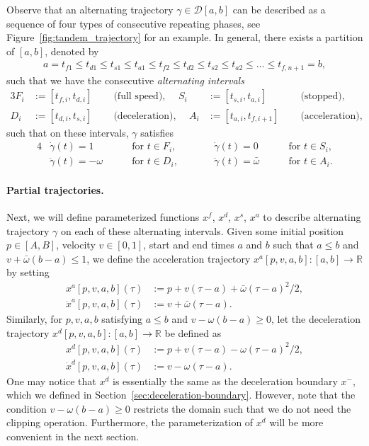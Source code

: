 \documentclass[a4paper]{article}
\theoremstyle{definition}
\theoremstyle{plain}
\begin{document}
Observe that an alternating trajectory $\gamma \in \mathcal{D}[a,b]$ can be described
as a sequence of four types of consecutive repeating phases, see
Figure~\ref{fig:tandem_trajectory} for an example.
%
In general, there exists a partition of $[a,b]$, denoted by
\begin{align*}
  a = t_{f1} \leq t_{d1} \leq t_{s1} \leq t_{a1} \leq t_{f2} \leq t_{d2} \leq t_{s2} \leq t_{a2} \leq \dots \leq t_{f,n+1} = b,
\end{align*}
such that we have the consecutive \emph{alternating intervals}
\begin{alignat*}{3}
  F_{i} &:= [t_{f,i}, t_{d,i}] \quad &\text{ (full speed), } \quad
  S_{i} &:= [t_{s,i}, t_{a,i}] \quad &\text{ (stopped), } \\
  D_{i} &:= [t_{d,i}, t_{s,i}] \quad &\text{ (deceleration), } \quad
  A_{i} &:= [t_{a,i}, t_{f,i+1}] \quad  &\text{ (acceleration), }
\end{alignat*}
%
such that on these intervals, $\gamma$ satisfies
%
\begin{alignat*}{4}
  &\dot{\gamma}(t) = 1 && \text{ for } t \in F_{i} , \quad \quad
  &&\dot{\gamma}(t) = 0 && \text{ for } t \in S_{i} ,\\
  &\ddot{\gamma}(t) = -\omega \quad && \text{ for } t \in D_{i} , \quad \quad
  &&\ddot{\gamma}(t) = \bar{\omega} \quad && \text{ for } t \in A_{i} .
\end{alignat*}

\paragraph{Partial trajectories.}
Next, we will define parameterized functions $x^{f}$, $x^{d}$, $x^{s}$, $x^{a}$
to describe alternating trajectory $\gamma$ on each of these alternating intervals.
%
Given some initial position $p \in [A,B]$, velocity $v \in [0, 1]$, start and end times $a$ and
$b$ such that $a \leq b$ and $v + \bar{\omega}(b - a) \leq 1$, we define the acceleration
trajectory $x^{a}[p, v, a, b] : [a, b] \rightarrow \mathbb{R}$ by setting
\begin{align}
  x^{a}[p,v,a,b](\tau) &:= p + v(\tau - a) + \bar{\omega} (\tau-a)^{2} / 2 , \\
  \dot{x}^{a}[p,v,a,b](\tau) &:= v + \bar{\omega} (\tau - a) .
\end{align}
%
Similarly, for $p, v, a, b$ satisfying $a \leq b$ and $v - \omega(b-a) \geq 0$,
let the deceleration trajectory
$x^{d}[p, v, a, b] : [a, b] \rightarrow \mathbb{R}$ be defined as
\begin{align}
  x^{d}[p,v,a,b](\tau) &:= p + v (\tau - a) - \omega (\tau - a)^{2} / 2 , \\
  \dot{x}^{d}[p,v,a,b](\tau) &:= v - \omega (\tau - a) .
\end{align}
%
One may notice that $x^{d}$ is essentially the same as the deceleration boundary
$x^{-}$, which we defined in Section~\ref{sec:deceleration-boundary}. However, note that the condition $v - \omega(b-a) \geq 0$ restricts the domain such that we do not need the clipping operation. Furthermore, the parameterization of $x^{d}$ will be more convenient in the next section.
\end{document}
